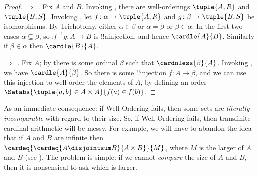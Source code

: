 \documentclass[../../../include/open-logic-section]{subfiles}
\begin{document}
\begin{proof}
	\emph{ $\Rightarrow$ .} Fix $A$ and $B$. Invoking , there are well-orderings $\tuple{A, R}$ and $\tuple{B, S}$. Invoking , let $f \colon \alpha \to \tuple{A, R}$ and $g \colon \beta \to \tuple{B, S}$ be isomorphisms. By Trichotomy, either $\alpha \in \beta$ or $\alpha = \beta$ or $\beta \in \alpha$. In the first two cases $\alpha \subseteq \beta$, so %
	$\comp{f^{-1}}{g} \colon A \to B$ is !!a{injection}, and hence $\cardle{A}{B}$. Similarly if $\beta \in \alpha$ then $\cardle{B}{A}$. 
	
	\emph{ $\Rightarrow$ .} Fix $A$; by  there is some ordinal $\beta$ such that $\cardnless{\beta}{A}$. Invoking , we have $\cardle{A}{\beta}$. So there is some !!{injection} $f \colon A \to \beta$, and we can use this injection to well-order the elements of $A$, by defining an order $\Setabs{\tuple{a, b} \in A \times A}{f(a) \in f(b)}$.
\end{proof}\noindent
As an immediate consequence: if Well-Ordering fails, then some sets are \emph{literally incomparable} with regard to their size. So, if Well-Ordering fails, then transfinite cardinal arithmetic will be messy. For example, we will have to abandon the idea that if $A$ and $B$ are infinite then $\cardeq{\cardeq{A \disjointsum B}{A \times B}}{M}$, where $M$ is the larger of $A$ and $B$ (see ). The problem is simple: if we cannot \emph{compare} the size of  $A$ and $B$, then it is nonsensical to ask which is larger.
\end{document}
